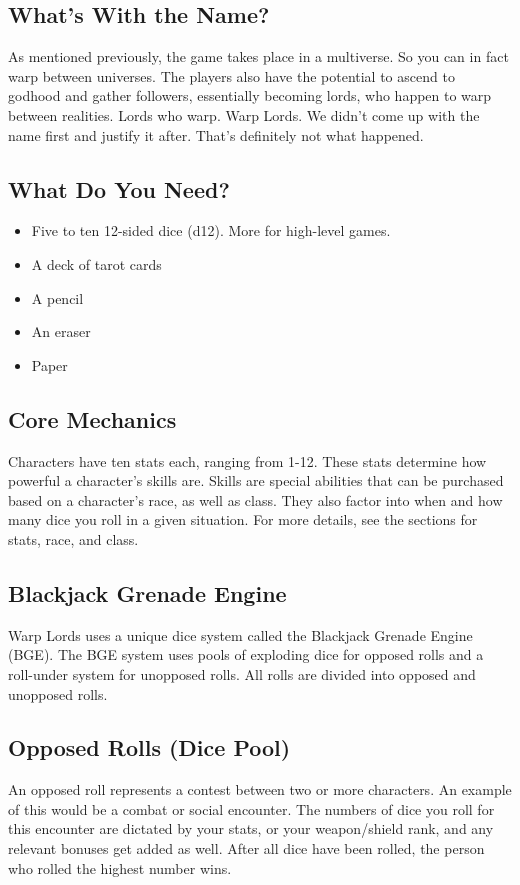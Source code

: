 \begin{multicols}{2}
\subsection{What’s With the Name?}
As mentioned previously, the game takes place in a multiverse. So you can in fact warp between universes. The players also have the potential to ascend to godhood and gather followers, essentially becoming lords, who happen to warp between realities. Lords who warp. Warp Lords. We didn't come up with the name first and justify it after. That's definitely not what happened.

\subsection{What Do You Need?}
\begin{itemize}
\item Five to ten 12-sided dice (d12). More for high-level games.
\item A deck of tarot cards
\item A pencil
\item An eraser
\item Paper
\end{itemize}

\subsection{Core Mechanics}
Characters have ten stats each, ranging from 1-12. These stats determine how powerful a character’s skills are. Skills are special abilities that can be purchased based on a character’s race, as well as class. They also factor into when and how many dice you roll in a given situation. For more details, see the sections for stats, race, and class.

\subsection{Blackjack Grenade Engine}
Warp Lords uses a unique dice system called the Blackjack Grenade Engine (BGE). The BGE system uses pools of exploding dice for opposed rolls and a roll-under system for unopposed rolls. All rolls are divided into opposed and unopposed rolls.

\subsection{Opposed Rolls (Dice Pool)}
An opposed roll represents a contest between two or more characters. An example of this would be a combat or social encounter. The numbers of dice you roll for this encounter are dictated by your stats, or your weapon/shield rank, and any relevant bonuses get added as well. After all dice have been rolled, the person who rolled the highest number wins.


\end{multicols}
